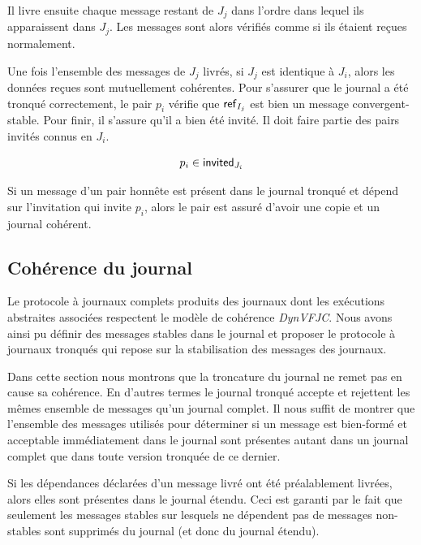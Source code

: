Il livre ensuite chaque message restant de $J_j$ dans l'ordre dans lequel ils apparaissent dans $J_j$.
Les messages sont alors vérifiés comme si ils étaient reçues normalement.

Une fois l'ensemble des messages de $J_j$ livrés, si $J_j$ est identique à $J_i$, alors les données reçues sont mutuellement cohérentes.
Pour s'assurer que le journal a été tronqué correctement, le pair $p_i$ vérifie que $\operatorname{\mathsf{ref}}_{I_j}$ est bien un message convergent-stable.
Pour finir, il s'assure qu'il a bien été invité.
Il doit faire partie des pairs invités connus en $J_i$.

\begin{equation*}
    p_i \in \operatorname{\mathsf{invited}}_{J_i}
\end{equation*}

Si un message d'un pair honnête est présent dans le journal tronqué et dépend sur l'invitation qui invite $p_i$, alors le pair est assuré d'avoir une copie et un journal cohérent.


\subsection{Cohérence du journal}

Le protocole à journaux complets produits des journaux dont les exécutions abstraites associées respectent le modèle de cohérence \emph{DynVFJC}.
Nous avons ainsi pu définir des messages stables dans le journal et proposer le protocole à journaux tronqués qui repose sur la stabilisation des messages des journaux.

Dans cette section nous montrons que la troncature du journal ne remet pas en cause sa cohérence.
En d'autres termes le journal tronqué accepte et rejettent les mêmes ensemble de messages qu'un journal complet.
Il nous suffit de montrer que l'ensemble des messages utilisés pour déterminer si un message est bien-formé et acceptable immédiatement dans le journal sont présentes autant dans un journal complet que dans toute version tronquée de ce dernier.

Si les dépendances déclarées d'un message livré ont été préalablement livrées, alors elles sont présentes dans le journal étendu.
Ceci est garanti par le fait que seulement les messages stables sur lesquels ne dépendent pas de messages non-stables sont supprimés du journal (et donc du journal étendu).

